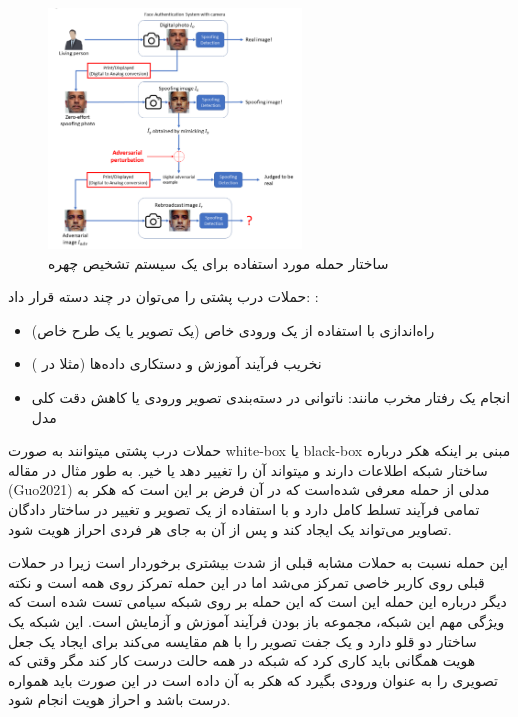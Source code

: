 \begin{figure}[h]
	\centering
	\includegraphics[width=0.6\textwidth]{img/report/Adversarial_attack_schema}
	\caption{ساختار حمله مورد استفاده برای یک سیستم تشخیص چهره\cite{Zhang2020}}
	\label{fig:Adverserial_Attack_schema}
	\centering
\end{figure}

\newpage
حملات درب پشتی را می‌توان در چند دسته قرار داد:
\cite{Guo2021}:
\begin{itemize}
	\item
	راه‌اندازی با استفاده از یک ورودی خاص (یک تصویر یا یک طرح خاص)
	\item
	نخریب فرآیند آموزش و دستکاری داده‌ها (مثلا در 
	)
	\item
	انجام یک رفتار مخرب مانند: ناتوانی در دسته‌بندی تصویر ورودی یا کاهش دقت کلی مدل	
\end{itemize}

حملات درب پشتی میتوانند به صورت white-box یا black-box مبنی بر اینکه هکر درباره ساختار شبکه اطلاعات دارند و میتواند آن را تغییر دهد یا خیر. به طور مثال در مقاله (Guo2021)
\cite{Guo2021}
مدلی از حمله معرفی شده‌است که در آن فرض بر این است که هکر به تمامی فرآیند تسلط کامل دارد و با استفاده از یک تصویر و تغییر در ساختار دادگان تصاویر می‌تواند یک 
ایجاد کند و پس از آن به جای هر فردی احراز هویت شود.

این حمله نسبت به حملات مشابه قبلی از شدت بیشتری برخوردار است زیرا در حملات قبلی روی کاربر خاصی تمرکز می‌شد اما در این حمله تمرکز روی همه است و نکته دیگر درباره این حمله این است که این حمله بر روی شبکه سیامی تست شده است که ویژگی مهم این شبکه، مجموعه باز بودن فرآیند آموزش و آزمایش است. این شبکه یک ساختار دو قلو دارد و یک جفت تصویر را با هم مقایسه می‌کند برای ایجاد یک جعل هویت همگانی باید کاری کرد که شبکه در همه حالت درست کار کند مگر وقتی که تصویری را به عنوان ورودی بگیرد که هکر به آن داده است در این صورت باید همواره درست باشد و احراز هویت انجام شود.


